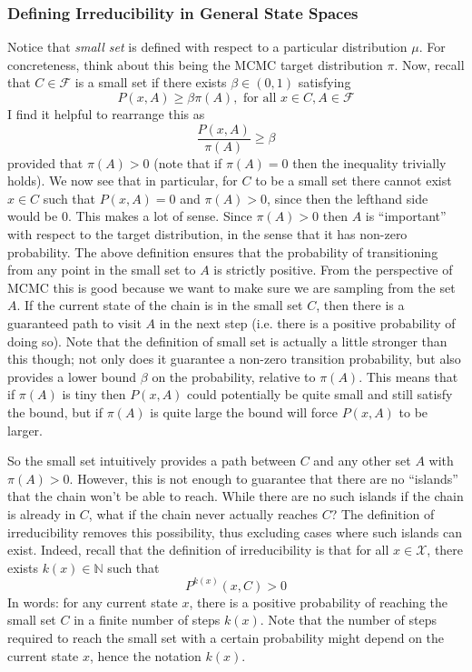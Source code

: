 \documentclass[12pt]{article}
\begin{document}
\subsubsection{Defining Irreducibility in General State Spaces}
Notice that \textit{small set} is defined with respect to a particular distribution $\mu$. For concreteness, think about this being the MCMC target distribution $\pi$. Now, recall  that $C \in \mathcal{F}$ is a small set 
if there exists $\beta \in (0, 1)$ satisfying
\[P(x, A) \geq \beta \pi(A), \text{ for all } x \in C, A \in \mathcal{F}\]
I find it helpful to rearrange this as 
\[\frac{P(x, A)}{\pi(A)} \geq \beta\]
provided that $\pi(A) > 0$ (note that if $\pi(A) = 0$ then the inequality trivially holds). We now see that in particular, for $C$ to be a small set there cannot exist $x \in C$ such that 
$P(x, A) = 0$ and $\pi(A) > 0$, since then the lefthand side would be $0$. This makes a lot of sense. Since $\pi(A) > 0$ then $A$ is ``important'' with respect to the target distribution, in the sense that it has non-zero 
probability. The above definition ensures that the probability of transitioning from any point in the small set to $A$ is strictly positive. From the perspective of MCMC this is good because we want to make sure we 
are sampling from the set $A$. If the current state of the chain is in the small set $C$, then there is a guaranteed path to visit $A$ in the next step (i.e. there is a positive probability of doing so). Note that the definition 
of small set is actually a little stronger than this though; not only does it guarantee a non-zero transition probability, but also provides a lower bound $\beta$ on the probability, relative to $\pi(A)$. This means that if 
$\pi(A)$ is tiny then $P(x, A)$ could potentially be quite small and still satisfy the bound, but if $\pi(A)$ is quite large the bound will force $P(x, A)$ to be larger.

So the small set intuitively provides a path between $C$ and any other set $A$ with $\pi(A) > 0$. However, this is not enough to guarantee that there are no ``islands'' that the chain won't be able to reach. While there 
are no such islands if the chain is already in $C$, what if the chain never actually reaches $C$? The definition of irreducibility removes this possibility, thus excluding cases where such islands can exist. Indeed, recall 
that the definition of irreducibility is that for all $x \in \mathcal{X}$, there exists $k(x) \in \mathbb{N}$ such that 
\[P^{k(x)}(x, C) > 0\]
In words: for any current state $x$, there is a positive probability of reaching the small set $C$ in a finite number of steps $k(x)$. Note that the number of steps required to reach the small set with a certain probability might 
depend on the current state $x$, hence the notation $k(x)$.   
\end{document}
